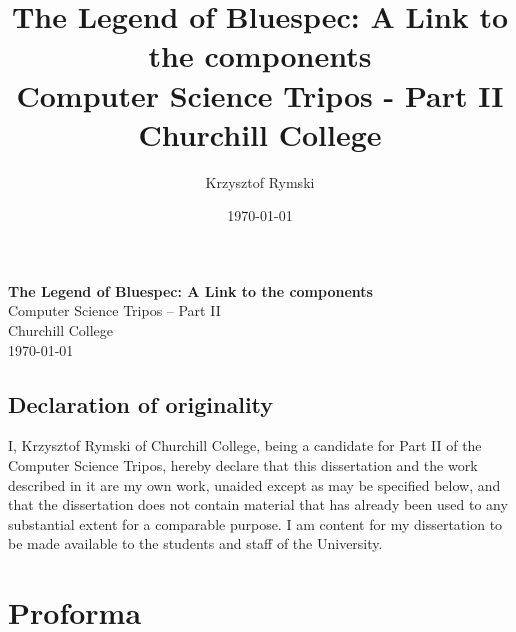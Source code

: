 \documentclass[12pt]{report}
\title{The Legend of Bluespec: A Link to the components \\
\large Computer Science Tripos - Part II \\
Churchill College}
\date{\today}
\author{Krzysztof Rymski}
\begin{document}


\pagestyle{empty}


\vspace*{60mm}
\begin{center}
\Huge
\textbf{The Legend of Bluespec: A Link to the components} \\[5mm]
Computer Science Tripos -- Part II \\[5mm]
Churchill College \\[5mm]
\today  %
\end{center}

\newpage
\section*{Declaration of originality}

I, Krzysztof Rymski of Churchill College, being a candidate for Part II of the Computer Science Tripos, hereby declare that this dissertation and the work described in it are my own work, unaided except as may be specified below, and that the dissertation does not contain material that has already been used to any substantial extent for a comparable purpose. I am content for my dissertation to be made available to the students and staff of the University.

\bigskip
{}

\medskip
{}


\newpage

\pagestyle{plain}

\chapter*{Proforma}
\end{document}
